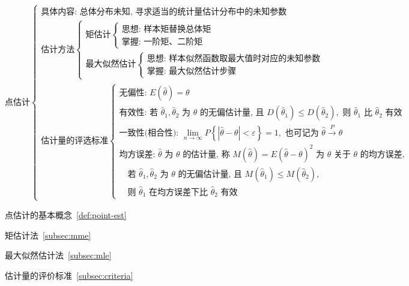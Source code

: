 \documentclass[lang=cn,11pt]{elegantbook}
\begin{document}
\[
\text{点估计}
\begin{cases}
\text{具体内容: 总体分布未知, 寻求适当的统计量估计分布中的未知参数} \\
\text{估计方法}
\begin{cases}
\text{矩估计}
\begin{cases}
\text{思想: 样本矩替换总体矩} \\
\text{掌握: 一阶矩、二阶矩}
\end{cases} \\
\text{最大似然估计}
\begin{cases}
\text{思想: 样本似然函数取最大值时对应的未知参数} \\
\text{掌握: 最大似然估计步骤}
\end{cases}
\end{cases} \\
\text{估计量的评选标准}
\begin{cases}
\text{无偏性: } E(\hat{\theta}) = \theta \\
\text{有效性: 若 } \hat{\theta}_1,\hat{\theta}_2 \text{ 为 } \theta \text{ 的无偏估计量, 且 } D(\hat{\theta}_1) \leq D(\hat{\theta}_2), \text{ 则 } \hat{\theta}_1 \text{ 比 } \hat{\theta}_2 \text{ 有效} \\
\text{一致性(相合性): } \lim\limits_{n \to \infty} P\left\{|\hat{\theta} - \theta| < \varepsilon\right\} = 1, \text{ 也可记为 } \hat{\theta} \xrightarrow{P} \theta \\
\text{均方误差: } \hat{\theta} \text{ 为 } \theta \text{ 的估计量, 称 } M(\hat{\theta}) = E(\hat{\theta} - \theta)^2 \text{ 为 } \hat{\theta} \text{ 关于 } \theta \text{ 的均方误差}, \\
\quad \text{若 } \hat{\theta}_1,\hat{\theta}_2 \text{ 为 } \theta \text{ 的无偏估计量, 且 } M(\hat{\theta}_1) \leq M(\hat{\theta}_2), \\
\quad \text{则 } \hat{\theta}_1 \text{ 在均方误差下比 } \hat{\theta}_2 \text{ 有效}
\end{cases}
\end{cases}
\]

\begin{introduction}
    \item 点估计的基本概念~\ref{def:point-est}
    \item 矩估计法~\ref{subsec:mme}
    \item 最大似然估计法~\ref{subsec:mle}
    \item 估计量的评价标准~\ref{subsec:criteria}
\end{introduction}
\end{document}
